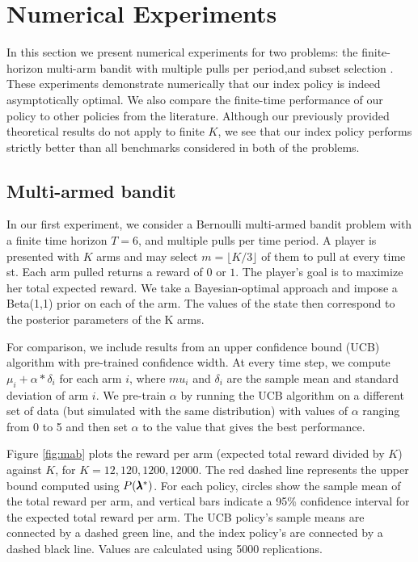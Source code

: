 \section{Numerical Experiments}\label{sec:num}
In this section we present numerical experiments for two problems: the finite-horizon multi-arm bandit with multiple pulls per period,and subset selection \citep{chen2008,Law1985}. These experiments demonstrate numerically that our index policy is indeed asymptotically optimal. We also compare the finite-time performance of our policy to other policies from the literature.  
Although our previously provided theoretical results do not apply to finite $K$, we see that our index policy performs strictly better than all benchmarks considered in both of the problems.

\subsection{Multi-armed bandit}\label{subsec:mab}
In our first experiment, we consider a Bernoulli multi-armed bandit problem with a finite time horizon $T=6$, and multiple pulls per time period. A player is presented with $K$ arms and may select $m=\lfloor K/3\rfloor$ of them to pull at every time st. Each arm pulled returns a reward of $0$ or $1$. 
The player's goal is to maximize her total expected reward. We take a Bayesian-optimal approach and impose a Beta(1,1) prior on each of the arm. The values of the state then correspond to the posterior parameters of the K arms.

For comparison, we include results from an upper confidence bound (UCB) algorithm with pre-trained confidence width. At every time step, we compute $\mu_i + \alpha*\delta_i$ for each arm $i$, where $mu_i$ and $\delta_i$ are the sample mean and standard deviation of arm $i$. We pre-train $\alpha$ by running the UCB algorithm on a different set of data (but simulated with the same distribution) with values of $\alpha$ ranging from 0 to 5 and then set $\alpha$ to the value that gives the best performance. 

Figure \ref{fig:mab} plots the reward per arm (expected total reward divided by $K$) 
against $K$, for $K=12,120,1200,12000$. 
The red dashed line represents the upper bound computed using $P(\pmb{\lambda}^*)$. For each policy, circles show the sample mean of the total reward per arm, and vertical bars indicate a 95\% confidence interval for the expected total reward per arm.  The UCB policy's sample means are connected by a dashed green line, and the index policy's are connected by a dashed black line.
Values are calculated using 5000 replications.

